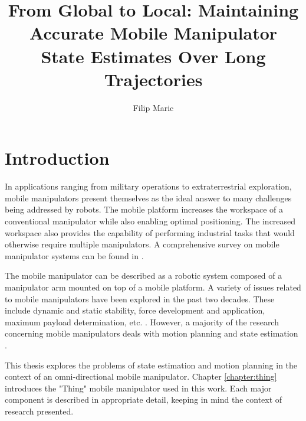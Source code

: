 \documentclass[times, utf8, diplomski, english]{fer}
\begin{document}

\title{From Global to Local: Maintaining Accurate Mobile Manipulator State Estimates Over Long Trajectories}

\author{Filip Maric}

\maketitle

\izvornik


\tableofcontents

\chapter{Introduction}
In applications ranging from military operations to extraterrestrial exploration, mobile manipulators present themselves as the ideal answer to many challenges being addressed by robots.
The mobile platform increases the workspace of a conventional manipulator while also enabling optimal positioning.
The increased workspace also provides the capability of performing industrial tasks that would otherwise require multiple manipulators.
A comprehensive survey on mobile manipulator systems can be found in \citep{bloch2003nonholonomic}.

The mobile manipulator can be described as a robotic system composed of a manipulator arm mounted on top of a mobile platform.
A variety of issues related to mobile manipulators have been explored in the past two decades. 
These include dynamic and static stability, force development and application, maximum payload determination, etc. \citep{papadopoulos1999framework,korayem2004analysis}.
However, a majority of the research concerning mobile manipulators deals with motion planning and state estimation \citep{yamamoto1992coordinating,korayem2012mathematical}.
 
This thesis explores the problems of state estimation and motion planning in the context of an omni-directional mobile manipulator.
Chapter \ref{chapter:thing} introduces the "Thing" mobile manipulator used in this work.
Each major component is described in appropriate detail, keeping in mind the context of research presented.
\end{document}

